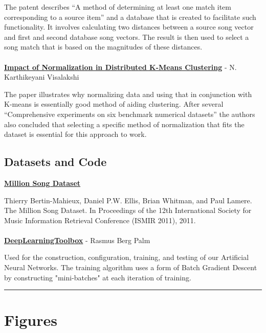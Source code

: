 \documentclass[12pt]{article}
\newcommand{\horizontalLine}{
	\begin{center}
		\hrule width 1.0\textwidth
	\end{center}
}
\begin{document}
The patent describes  ``A method of determining at least one match item corresponding to a source item'' and a database that is created to facilitate such functionality. It involves calculating two distances between a source song vector and  first and second database song vectors. The result is then used to select a song match that is based on the magnitudes of these distances.
\\
\\
\href{http://www.medwelljournals.com/fulltext/?doi=ijscomp.2009.168.172}{\textbf{Impact of Normalization in Distributed K-Means Clustering}} - N. Karthikeyani Visalakshi 

The paper illustrates why normalizing data and using that in conjunction with K-means is essentially good method of aiding clustering. After several ``Comprehensive experiments on six benchmark numerical datasets'' the authors also concluded that selecting a specific method of normalization that fits the dataset is essential for this approach to work.

\subsection{Datasets and Code}
\href{http://labrosa.ee.columbia.edu/millionsong/}{\textbf{Million Song Dataset}}

Thierry Bertin-Mahieux, Daniel P.W. Ellis, Brian Whitman, and Paul Lamere. 
The Million Song Dataset. In Proceedings of the 12th International Society
for Music Information Retrieval Conference (ISMIR 2011), 2011.
\\
\\
\href{https://github.com/rasmusbergpalm/DeepLearnToolbox}{\textbf{DeepLearningToolbox}} - Rasmus Berg Palm

Used for the construction, configuration, training, and testing of our Artificial Neural Networks. The training algorithm uses a form of Batch Gradient Descent by constructing "mini-batches" at each iteration of training.

\appendix

\horizontalLine
\section{Figures}
\label{sec:figures}
\end{document}
